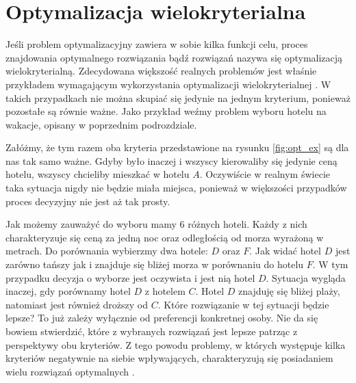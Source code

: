 \documentclass[twoside]{iisthesis}
\begin{document}
\section{Optymalizacja wielokryterialna}
Jeśli problem optymalizacyjny zawiera w sobie kilka funkcji celu, proces znajdowania optymalnego rozwiązania bądź rozwiązań nazywa się optymalizacją wielokryterialną. Zdecydowana większość realnych problemów jest właśnie przykładem wymagającym wykorzystania optymalizacji wielokryterialnej \cite{book}. W takich przypadkach nie można skupiać się jedynie na jednym kryterium, ponieważ pozostałe są równie ważne. Jako przykład weźmy problem wyboru hotelu na wakacje, opisany w poprzednim podrozdziale. 

Załóżmy, że tym razem oba kryteria przedstawione na rysunku \eqref{fig:opt_ex} są dla nas tak samo ważne. Gdyby było inaczej i wszyscy kierowaliby się jedynie ceną hotelu, wszyscy chcieliby mieszkać w hotelu $A$. Oczywiście w realnym świecie taka sytuacja nigdy nie będzie miała miejsca, ponieważ w większości przypadków proces decyzyjny nie jest aż tak prosty.

Jak możemy zauważyć do wyboru mamy 6 różnych hoteli. Każdy z nich charakteryzuje się ceną za jedną noc oraz odległością od morza wyrażoną w metrach. Do porównania wybierzmy dwa hotele: $D$ oraz $F$. Jak widać hotel $D$ jest zarówno tańszy jak i znajduje się bliżej morza w porównaniu do hotelu $F$. W tym przypadku decyzja o wyborze jest oczywista i jest nią hotel $D$. Sytuacja wygląda inaczej, gdy porównamy hotel $D$ z hotelem $C$. Hotel $D$ znajduję się bliżej plaży, natomiast jest również droższy od $C$. Które rozwiązanie w tej sytuacji będzie lepsze? To już zależy wyłącznie od preferencji konkretnej osoby. Nie da się bowiem stwierdzić, które z wybranych rozwiązań jest lepsze patrząc z perspektywy obu kryteriów. Z tego powodu problemy, w których występuje kilka kryteriów negatywnie na siebie wpływających, charakteryzują się posiadaniem wielu rozwiązań optymalnych \cite{book_ergot}.
\end{document}
